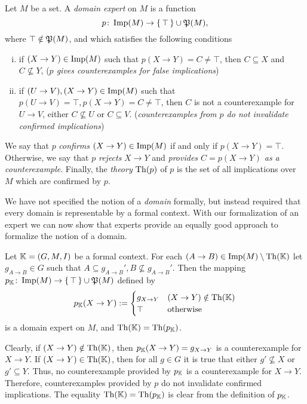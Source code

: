 \begin{Definition}
  \label{def:domain-expert}
  Let $M$ be a set.  A \emph{domain expert} on $M$ is a function
  \begin{equation*}
    p \colon \operatorname{Imp}(M) \to {\ensuremath{\{\, \top \,\}}} \cup {\ensuremath{\mathfrak{P}(M)}},
  \end{equation*}
  where $\top \notin {\ensuremath{\mathfrak{P}(M)}}$, and which satisfies the following conditions
  \begin{enumerate}[i. ]
  \item if $(X \to Y) \in \operatorname{Imp}(M)$ such that $p(X \to Y) = C \neq \top$, then $C \subseteq
    X$ and $C \not\subseteq Y$, (\emph{$p$ gives counterexamples for false implications})
  \item if $(U \to V), (X \to Y) \in \operatorname{Imp}(M)$ such that $p(U \to V) = \top, p(X \to Y) = C
    \neq \top$, then $C$ is not a counterexample for $U \to V$, \ie either $C
    \not\subseteq U$ or $C \subseteq V$. (\emph{counterexamples from $p$ do not invalidate
      confirmed implications})
  \end{enumerate}
  We say that $p$ \emph{confirms} $(X \to Y) \in \operatorname{Imp}(M)$ if and only if $p(X \to Y) =
  \top$.  Otherwise, we say that $p$ \emph{rejects} $X \to Y$ and \emph{provides $C = p(X
    \to Y)$ as a counterexample}.  Finally, the \emph{theory} $\operatorname{Th}(p)$ of $p$ is the set
  of all implications over $M$ which are confirmed by $p$.
\end{Definition}

We have not specified the notion of a \emph{domain} formally, but instead required that
every domain is representable by a formal context.  With our formalization of an expert we
can now show that experts provide an equally good approach to formalize the notion of a
domain.

\begin{Proposition}
  \label{prop:domain-expert-from-domain}
  Let ${\mathbb{K}} = (G, M, I)$ be a formal context.  For each $(A \to B) \in \operatorname{Imp}(M) \setminus
  \operatorname{Th}({\mathbb{K}})$ let $g_{A \to B} \in G$ such that $A \subseteq g_{A \to B}', B
  \not\subseteq g_{A \to B}'$.  Then the mapping $p_{{\mathbb{K}}} \colon \operatorname{Imp}(M) \to {\ensuremath{\{\, \top \,\}}} \cup
  {\ensuremath{\mathfrak{P}(M)}}$ defined by
  \begin{equation*}
    p_{{\mathbb{K}}}(X \to Y) :=
    \begin{cases}
      g_{X \to Y} & (X \to Y) \notin \operatorname{Th}({\mathbb{K}}) \\
      \top & \text{otherwise}
    \end{cases}
  \end{equation*}
  is a domain expert on $M$, and $\operatorname{Th}({\mathbb{K}}) = \operatorname{Th}(p_{{\mathbb{K}}})$.
\end{Proposition}
\begin{Proof}
  Clearly, if $(X \to Y) \notin \operatorname{Th}({\mathbb{K}})$, then $p_{{\mathbb{K}}}(X \to Y) = g_{X \to Y}$ is
  a counterexample for $X \to Y$.  If $(X \to Y) \in \operatorname{Th}({\mathbb{K}})$, then for all $g \in G$
  it is true that either $g' \not\subseteq X$ or $g' \subseteq Y$.  Thus, no
  counterexample provided by $p_{{\mathbb{K}}}$ is a counterexample for $X \to Y$.  Therefore,
  counterexamples provided by $p$ do not invalidate confirmed implications.  The equality
  $\operatorname{Th}({\mathbb{K}}) = \operatorname{Th}(p_{{\mathbb{K}}})$ is clear from the definition of $p_{{\mathbb{K}}}$.
\end{Proof}

